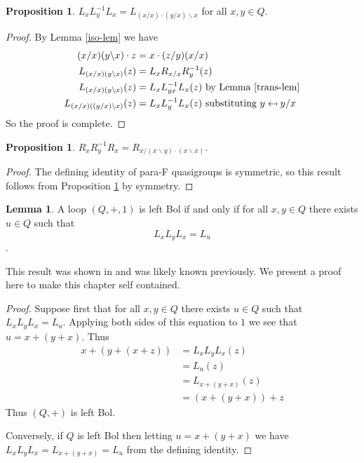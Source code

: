 \documentclass[12pt]{report}
\theoremstyle{definition}
\newtheorem{lem}[thm]{Lemma}
\newtheorem{prp}[thm]{Proposition}
\newcommand{\ldv}{\backslash}       %
\newcommand{\rdv}{/}                %
\begin{document}
\begin{prp}\label{BI}
  $L_x L_y^{-1} L_x = L_{(x\rdv x)\cdot (y\rdv x)\ldv x}$ for all $x, y\in Q$. 
\end{prp}

\begin{proof}
  By Lemma \ref{iso-lem} we have
  \begin{align*}
    (x\rdv x)(y\ldv x)\cdot z &= x\cdot (z\rdv y)(x\rdv x)\\
    L_{(x\rdv x)(y\ldv x)}(z) &= L_x R_{x\rdv x} R_y^{-1}(z)\\
    L_{(x\rdv x)(y\ldv x)}(z) &= L_x L_{yx}^{-1} L_x(z)\text{ by Lemma \ref{trans-lem}}\\
    L_{(x\rdv x)((y\rdv x)\ldv x)}(z) &= L_x L_y^{-1} L_x(z)\text{ substituting $y\mapsfrom y\rdv x$}
  \end{align*}
  So the proof is complete.
\end{proof}

\begin{prp}\label{BI-dual}
  $R_x R_y^{-1} R_x = R_{x\rdv (x\ldv y)\cdot (x\ldv x)}$.
\end{prp}

\begin{proof}
  The defining identity of para-F quasigroups is symmetric, so this result follows from Proposition \ref{BI}
    by symmetry.
\end{proof}

\begin{lem}\label{bol-char}
  A loop $(Q, +, 1)$ is left Bol if and only if for all $x, y\in Q$ there exists $u \in Q$ such that 
  \[L_x L_y L_x = L_u\] \cite{BK-isotopes}.
\end{lem}

This result was shown in \cite{BK-isotopes} and was likely known previously. We present a proof here to
  make this chapter self contained.

\begin{proof}
  Suppose first that for all $x, y \in Q$ there exists $u\in Q$ such that $L_x L_y L_x = L_u$. Applying
    both sides of this equation to $1$ we see that $u = x + (y + x)$. Thus
  \begin{align*}
    x + (y + (x + z)) &= L_x L_y L_x(z)\\
    &= L_u(z)\\
    &= L_{x + (y + x)}(z)\\
    &= (x + (y + x)) + z
  \end{align*}
  Thus $(Q, +)$ is left Bol.

  Conversely, if $Q$ is left Bol then letting $u = x + (y + x)$ we
    have $L_x L_y L_x = L_{x + (y + x)} = L_u$ from the defining identity.
\end{proof}
\end{document}
